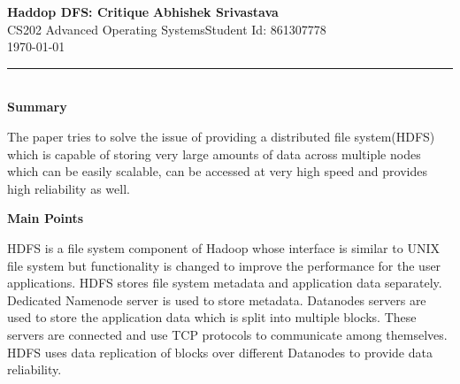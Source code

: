 \documentclass[a4paper, 10pt]{article}
\begin{document}
\noindent
\large\textbf{Haddop DFS: Critique} \hfill \textbf{Abhishek Srivastava} \\
\normalsize CS202 Advanced Operating Systems\hfill Student Id: 861307778 \\
\hfill \today \\
\hrule

\noindent
\\
\large\textbf{Summary}

The paper tries to solve the issue of providing a distributed file system(HDFS) which is capable of storing very large amounts of data across multiple nodes which can be easily scalable, can be accessed at very high speed and provides high reliability as well.

\noindent
\large\textbf{Main Points}

HDFS is a file system component of Hadoop whose interface is similar to UNIX file system but functionality is changed to improve the performance for the user applications. HDFS stores file system metadata and application data separately. Dedicated Namenode server is used to store metadata. Datanodes servers are used to store the application data which is split into multiple blocks. These servers are connected and use TCP protocols to communicate among themselves. HDFS uses data replication of blocks over different Datanodes to provide data reliability.
\end{document}

